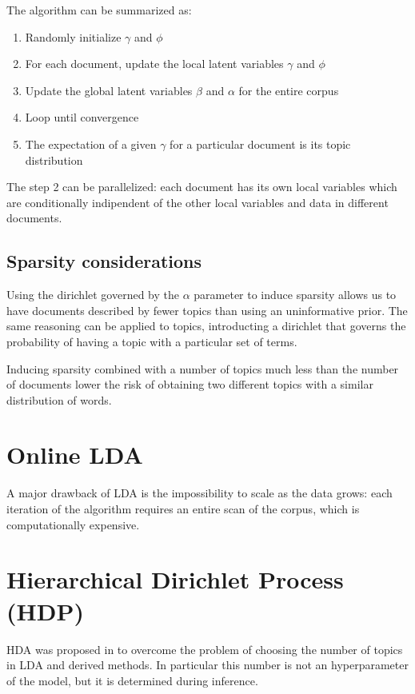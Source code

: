 The algorithm can be summarized as:
\begin{enumerate}
    \item Randomly initialize $\gamma$ and $\phi$
    \item For each document, update the local latent variables $\gamma$ and $\phi$
    \item Update the global latent variables $\beta$ and $\alpha$ for the entire corpus
    \item Loop until convergence
    \item The expectation of a given $\gamma$ for a particular document is its topic distribution
\end{enumerate}

The step 2 can be parallelized: each document has its own local variables which are conditionally indipendent
of the other local variables and data in different documents.

\subsection{Sparsity considerations}
Using the dirichlet governed by the $\alpha$ parameter to induce sparsity
allows us to have documents described by fewer topics than using an uninformative prior.
The same reasoning can be applied to topics, introducting a dirichlet that governs the
probability of having a topic with a particular set of terms.

Inducing sparsity combined with a number of topics much less than the number of documents
lower the risk of obtaining two different topics with a similar distribution of words.


\section{Online LDA}
A major drawback of LDA is the impossibility to scale as the data grows:
each iteration of the algorithm requires an entire scan of the corpus, which is computationally expensive.

\section{Hierarchical Dirichlet Process (HDP)}
HDA was proposed in \cite{DBLP:journals/jmlr/WangPB11} to overcome the problem of choosing the number of topics in LDA and derived methods.
In particular this number is not an hyperparameter of the model, but it is determined during inference.
